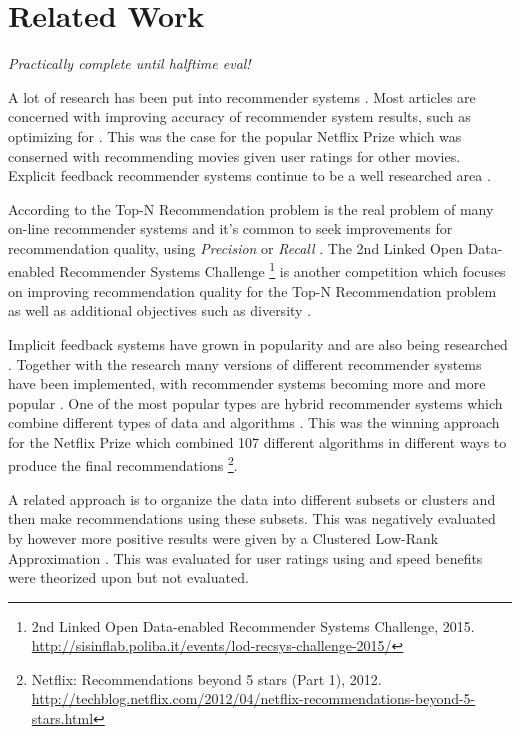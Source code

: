 \chapter{Related Work}\label{cha:relwork}


\textit{Practically complete until halftime eval!}

A lot of research has been put into recommender systems \citep{bobadilla2013recommender}. Most articles are concerned with improving accuracy of recommender system results, such as optimizing for \rmse. This was the case for the popular Netflix Prize \citep{bennett2007netflix} which was conserned with recommending movies given user ratings for other movies. Explicit feedback recommender systems continue to be a well researched area \citep{bobadilla2013recommender}.

According to \citep{lai2012hybrid} the Top-N Recommendation problem is the real problem of many on-line recommender systems and it's common to seek improvements for recommendation quality, using \textit{Precision} or \textit{Recall} \citep{bobadilla2013recommender}. The 2nd Linked Open Data-enabled Recommender Systems Challenge
\footnote{2nd Linked Open Data-enabled Recommender Systems Challenge, 2015. \url{http://sisinflab.poliba.it/events/lod-recsys-challenge-2015/}}
is another competition which focuses on improving recommendation quality for the Top-N Recommendation problem as well as additional objectives such as diversity \citep{bobadilla2013recommender}.

Implicit feedback systems have grown in popularity and are also being researched \citep{hu2008collaborative, bobadilla2013recommender}. Together with the research many versions of different recommender systems have been implemented, with recommender systems becoming more and more popular \citep{bobadilla2013recommender}. One of the most popular types are hybrid recommender systems which combine different types of data and algorithms \citep{bobadilla2013recommender, lai2012hybrid}. This was the winning approach for the Netflix Prize which combined 107 different algorithms in different ways to produce the final recommendations
\footnote{ Netflix: Recommendations beyond 5 stars (Part 1), 2012. \url{http://techblog.netflix.com/2012/04/netflix-recommendations-beyond-5-stars.html} }.

A related approach is to organize the data into different subsets or clusters and then make recommendations using these subsets. This was negatively evaluated by \citep{cacheda2011comparison} however more positive results were given by a Clustered Low-Rank Approximation \citep{niklas, savas2011clustered}.  This was evaluated for user ratings using \rmse and speed benefits were theorized upon but not evaluated.

